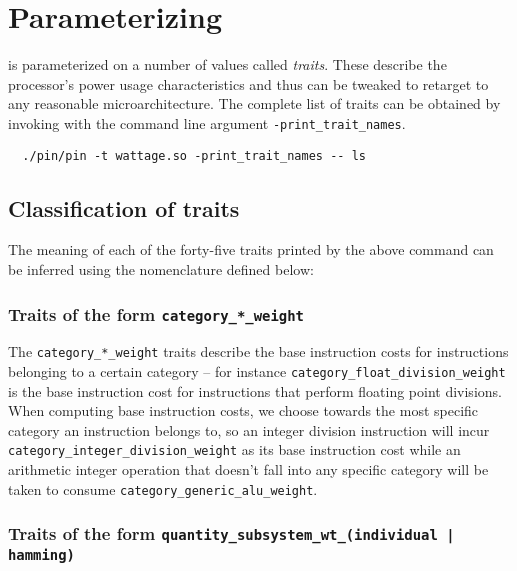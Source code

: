 
\chapter{Parameterizing \wattage} %

\label{AppendixA}


\wattage is parameterized on a number of values called
\textit{traits}.  These describe the processor's power usage
characteristics and thus can be tweaked to retarget \wattage to any
reasonable microarchitecture.  The complete list of traits can be
obtained by invoking \wattage with the command line argument
\texttt{-print\_trait\_names}.

\begin{verbatim}
  ./pin/pin -t wattage.so -print_trait_names -- ls
\end{verbatim}

\section{Classification of traits}
\label{sec:traits-desc}

The meaning of each of the forty-five traits printed by the above
command can be inferred using the nomenclature defined below:

\subsection{Traits of the form \texttt{category\_*\_weight}}

The \texttt{category\_*\_weight} traits describe the base instruction
costs for instructions belonging to a certain category -- for instance
\texttt{category\_float\_division\_weight} is the base instruction
cost for instructions that perform floating point divisions.  When
computing base instruction costs, we choose towards the most specific
category an instruction belongs to, so an integer division instruction
will incur \texttt{category\_integer\_division\_weight} as its base
instruction cost while an arithmetic integer operation that doesn't
fall into any specific category will be taken to consume
\texttt{category\_generic\_alu\_weight}.

\subsection{Traits of the form \texttt{quantity\_subsystem\_wt\_(individual | hamming) }}


